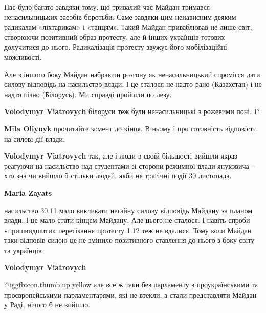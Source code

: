  
 
 
 
 
\zzSecCmt

\begin{itemize} %

Нас було багато завдяки тому, що тривалий час Майдан тримався ненасильницьких
засобів боротьби. Саме завдяки цим ненависним деяким радикалам «ліхтарикам» і
«танцям». Такий Майдан приваблював не лише світ, створюючи позитивний образ
протесту, але й інших українців готових долучитися до нього. Радикалізація
протесту звужує його мобілізаційні можливості.

Але з іншого боку Майдан набравши розгону як ненасильницький спромігся дати
силову відповідь на насильство влади. І це сталося не надто рано (Казахстан) і
не надто пізно (Білорусь). Ми справді пройшли по лезу.

\begin{itemize} %
\textbf{Volodymyr Viatrovych} білоруси теж були ненасильницькі з рожевими поні. І?

\textbf{Mila Oliynyk} прочитайте комент до кінця. В ньому і про готовність відповісти на силові дії влади.

\textbf{Volodymyr Viatrovych} так, але і люди в своїй більшості вийшли якраз реагуючи на насильство над студентами зі сторони режимної влади януковича – хто зна чи вийшло б стільки людей, якби не трагічні події 30 листопада.

\textbf{Maria Zayats} 

насильство 30.11 мало викликати негайну силову відповідь Майдану за планом
влади. І це мало стати кінцем Майдану. Але цього не сталося. І навіть спроби
«пришвидшити» перетікання протесту 1.12 теж не вдалися. Тому коли Майдан таки
відповів силою це не змінило позитивного ставлення до нього з боку світу та
українців

\textbf{Volodymyr Viatrovych}

 @igg{fbicon.thumb.up.yellow}  але все ж таки без парламенту з проукраїнськими та проєвропейськими
парламентарями, які не втекли, а стали представляти Майдан у Раді, нічого б не
вийшло.


\end{itemize}
\end{itemize}
